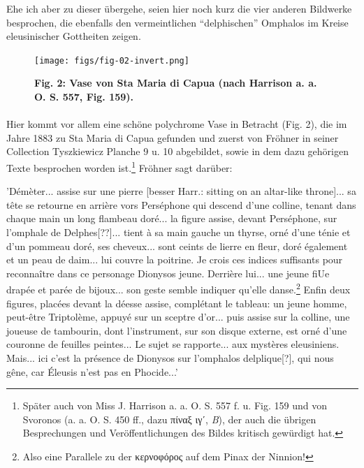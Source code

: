 \documentclass[a4paper, 11pt, oneside]{article}
\begin{document}
Ehe ich aber zu dieser übergehe, seien hier noch kurz die vier anderen Bildwerke besprochen, die ebenfalls den vermeintlichen "`delphischen"' Omphalos im Kreise eleusinischer Gottheiten zeigen.

\begin{figure}[H]
\centering
\texttt{[image: figs/fig-02-invert.png]}
\caption{\bfseries Fig. 2: Vase von Sta Maria di Capua (nach Harrison a. a. O. S. 557, Fig. 159).}
\end{figure}
\paragraph{}
Hier kommt vor allem eine schöne polychrome Vase in Betracht (Fig. 2), die im Jahre 1883 zu Sta Maria di Capua gefunden und zuerst von Fröhner in seiner Collection Tyszkiewicz Planche 9 u. 10 abgebildet, sowie in dem dazu gehörigen Texte besprochen worden ist.\footnote{Später auch von Miss J. Harrison a. a. O. S. 557 f. u. Fig. 159 und von Svoronos (a. a. O. S. 450 ff., dazu πίναξ ιγʹ, \emph{B}), der auch die übrigen Besprechungen und Veröffentlichungen des Bildes kritisch gewürdigt hat.} Fröhner sagt darüber:

'Démèter... assise sur une pierre [besser Harr.: sitting on an altar-like throne]... sa tête se retourne en arrière vors Perséphone qui descend d'une colline, tenant dans chaque main un long flambeau doré... la figure assise, devant Perséphone, sur l'omphale de Delphes[??]... tient à sa main gauche un thyrse, orné d'une ténie et d'un pommeau doré, ses cheveux... sont ceints de lierre en fleur, doré également et un peau de daim... lui couvre la poitrine. Je crois ces indices suffisants pour reconnaître dans ce personage Dionysos jeune. Derrière lui... une jeune fiUe drapée et parée de bijoux... son geste semble indiquer qu'elle danse.\footnote{Also eine Parallele zu der κερνοφόρος auf dem Pinax der Ninnion!} Enfin deux figures, placées devant la déesse assise, complétant le tableau: un jeune homme, peut-être Triptolème, appuyé sur un sceptre d'or... puis assise sur la colline, une joueuse de tambourin, dont l'instrument, sur son disque externe, est orné d'une couronne de feuilles peintes... Le sujet se rapporte... aux mystères eleusiniens. Mais... ici c'est la présence de Dionysos sur l'omphalos delplique[?], qui nous gêne, car Éleusis n'est pas en Phocide...'
\end{document}
